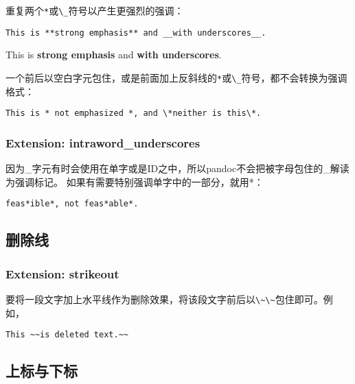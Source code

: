 \documentclass[fancyhdr,bookmark]{ctexbook}
\newcommand{\passthrough}[1]{#1}
\begin{document}
重复两个\passthrough{\lstinline!*!}或\passthrough{\lstinline!\_!}符号以产生更强烈的强调：

\begin{lstlisting}
This is **strong emphasis** and __with underscores__.
\end{lstlisting}

This is \textbf{strong emphasis} and \textbf{with underscores}.

一个前后以空白字元包住，或是前面加上反斜线的\passthrough{\lstinline!*!}或\passthrough{\lstinline!\_!}符号，都不会转换为强调格式：

\begin{lstlisting}
This is * not emphasized *, and \*neither is this\*.
\end{lstlisting}

\hypertarget{extension-intraword_underscores}{%
\subsubsection{Extension:
intraword\_underscores}\label{extension-intraword_underscores}}

因为\_字元有时会使用在单字或是ID之中，所以pandoc不会把被字母包住的\_解读为强调标记。
如果有需要特别强调单字中的一部分，就用*：

\begin{lstlisting}
feas*ible*, not feas*able*.
\end{lstlisting}

\hypertarget{ux5220ux9664ux7ebf}{%
\subsection{删除线}\label{ux5220ux9664ux7ebf}}

\hypertarget{extension-strikeout}{%
\subsubsection{Extension: strikeout}\label{extension-strikeout}}

要将一段文字加上水平线作为删除效果，将该段文字前后以\passthrough{\lstinline!\~\~!}包住即可。例如，

\begin{lstlisting}
This ~~is deleted text.~~
\end{lstlisting}

\hypertarget{ux4e0aux6807ux4e0eux4e0bux6807}{%
\subsection{上标与下标}\label{ux4e0aux6807ux4e0eux4e0bux6807}}
\end{document}
